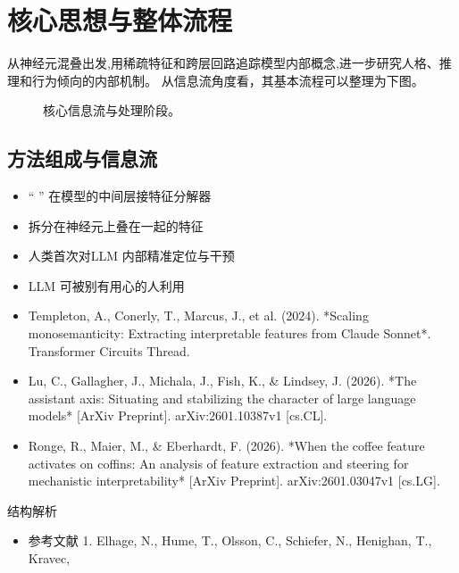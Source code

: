 \documentclass[UTF8,11pt,a4paper]{ctexart}
\begin{document}
\section{核心思想与整体流程}
从神经元混叠出发,用稀疏特征和跨层回路追踪模型内部概念,进一步研究人格、推理和行为倾向的内部机制。 从信息流角度看，其基本流程可以整理为下图。

\begin{figure}[H]
\centering
{}
\caption{核心信息流与处理阶段。}
\end{figure}

\subsection{方法组成与信息流}
\begin{itemize}
\item “ ” 在模型的中间层接特征分解器
\item 拆分在神经元上叠在一起的特征
\item 人类首次对LLM 内部精准定位与干预
\item LLM 可被别有用心的人利用
\item Templeton, A., Conerly, T., Marcus, J., et al. (2024). *Scaling monosemanticity: Extracting interpretable features from Claude Sonnet*. Transformer Circuits Thread.
\item Lu, C., Gallagher, J., Michala, J., Fish, K., \& Lindsey, J. (2026). *The assistant axis: Situating and stabilizing the character of large language models* [ArXiv Preprint]. arXiv:2601.10387v1 [cs.CL].
\item Ronge, R., Maier, M., \& Eberhardt, F. (2026). *When the coffee feature activates on coffins: An analysis of feature extraction and steering for mechanistic interpretability* [ArXiv Preprint]. arXiv:2601.03047v1 [cs.LG].
\end{itemize}

\begin{keybox}{结构解析}
\begin{itemize}
\item 参考文献 1. Elhage, N., Hume, T., Olsson, C., Schiefer, N., Henighan, T., Kravec,
\end{itemize}
\end{keybox}
\end{document}
